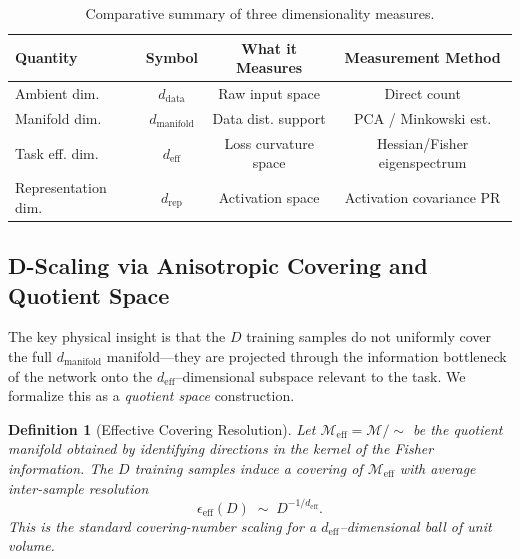 \documentclass[11pt, a4paper]{article}
\newtheorem{dfn}[theo]{Definition}
\theoremstyle{plain}
\begin{document}
\begin{table}[htbp]
\centering
\caption{Comparative summary of three dimensionality measures.}
\label{tab:dim_comparison}
\begin{tabular}{@{}lccc@{}}
\toprule
Quantity & Symbol & What it Measures & Measurement Method \\ \midrule
Ambient dim. & $d_{\mathrm{data}}$ & Raw input space & Direct count \\
Manifold dim. & $d_{\mathrm{manifold}}$ & Data dist. support & PCA / Minkowski est. \\
Task eff. dim. & $d_{\mathrm{eff}}$ & Loss curvature space & Hessian/Fisher eigenspectrum \\
Representation dim. & $d_{\mathrm{rep}}$ & Activation space & Activation covariance PR \\ \bottomrule
\end{tabular}
\end{table}

\subsection{D-Scaling via Anisotropic Covering and Quotient Space}
\label{sec:anisotropic_covering}

The key physical insight is that the $D$ training samples do not uniformly cover the full $d_{\mathrm{manifold}}$ manifold---they are projected through the information bottleneck of the network onto the $d_{\mathrm{eff}}$--dimensional subspace relevant to the task. We formalize this as a \emph{quotient space} construction.

\begin{dfn}[Effective Covering Resolution]
\label{dfn:eff_resolution}
Let $\mathcal{M}_{\mathrm{eff}} = \mathcal{M} / \sim$ be the quotient manifold obtained by identifying directions in the kernel of the Fisher information. The $D$ training samples induce a covering of $\mathcal{M}_{\mathrm{eff}}$ with average inter-sample resolution
\begin{equation}
    \epsilon_{\mathrm{eff}}(D) \;\sim\; D^{-1/d_{\mathrm{eff}}}.
    \label{eq:epsilon_eff}
\end{equation}
This is the standard covering-number scaling for a $d_{\mathrm{eff}}$--dimensional ball of unit volume.
\end{dfn}
\end{document}
